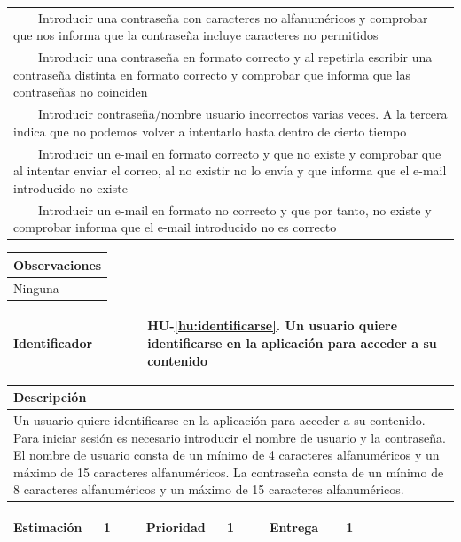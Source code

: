 \documentclass[11pt]{article}
\newcommand{\tabitem}{~~\llap{\textbullet}~~}
\begin{document}
\begin{longtable}{p{1.028\linewidth}}
  \tabitem Introducir una contraseña con caracteres no alfanuméricos y comprobar que nos informa que la contraseña incluye caracteres no permitidos\\
  \tabitem Introducir una contraseña en formato correcto y al repetirla escribir una contraseña distinta en formato correcto y comprobar que informa que las contraseñas no coinciden\\
  \tabitem Introducir contraseña/nombre usuario incorrectos varias veces. A la tercera indica que no podemos volver a intentarlo hasta dentro de cierto tiempo\\
  \tabitem Introducir un e-mail en formato correcto y que no existe y comprobar que al intentar enviar el correo, al no existir no lo envía y que informa que el e-mail introducido no existe\\
  \tabitem Introducir un e-mail en formato no correcto y que por tanto, no existe y comprobar informa que el e-mail introducido no es correcto\\

\end{longtable}
\begin{longtable}{p{1.028\linewidth}}
  \textbf{Observaciones}\\
  \midrule
  Ninguna\\
  \bottomrule
  \bottomrule
\end{longtable}
\bigskip


  \centering
  \begin{longtable}{p{0.3\linewidth}|p{0.7\linewidth}}
    \toprule
    \toprule
    \textbf{Identificador} & \textbf{HU-\ref{hu:identificarse}}. Un usuario quiere identificarse en la aplicación para acceder a su contenido\\
    
    \bottomrule
  \end{longtable}

  \begin{longtable}{p{1.028\linewidth}}
    \textbf{Descripción}\\
    \midrule
    Un usuario quiere identificarse en la aplicación para acceder a su contenido. Para iniciar sesión es necesario introducir el nombre de usuario y la contraseña. El nombre de usuario consta de un mínimo de 4 caracteres alfanuméricos y un máximo de 15 caracteres alfanuméricos. La contraseña consta de un mínimo de 8 caracteres alfanuméricos y un máximo de 15 caracteres alfanuméricos.
  \end{longtable}
  \begin{longtable}{p{0.18\linewidth}|p{0.1\linewidth}|p{0.18\linewidth}|p{0.1\linewidth}|p{0.18\linewidth}|p{0.1\linewidth}}
    \toprule
    \textbf{Estimación} & 1 & \textbf{Prioridad} & 1 & \textbf{Entrega} & 1 \\
    \bottomrule
  \end{longtable}
\end{document}
